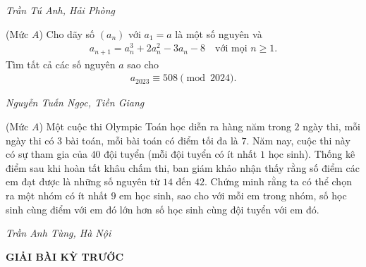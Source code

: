 \begin{multicols}{2}
\begin{figure}[H]
		\vspace*{-10pt}
	\end{figure}
	\begin{flushright}
		\textit{Trần Tú Anh, Hải Phòng}
	\end{flushright}
	{}
	(Mức $A$) Cho dãy số $(a_n)$ với $a_1=a$ là một số nguyên và 
	\begin{align*}
		a_{n+1}=a_n^3+2a_n^2-3a_n-8\quad\text{với mọi $n\ge1$.}
	\end{align*}
	Tìm tất cả các số nguyên $a$  sao cho 
	\begin{align*}
		a_{2023}\equiv508\pmod{2024}.
	\end{align*}
	\begin{flushright}
		\textit{Nguyễn Tuấn Ngọc, Tiền Giang}
	\end{flushright}
	{}
	(Mức $A$) Một cuộc thi Olympic Toán học diễn ra hàng năm trong $2$ ngày thi, mỗi ngày thi có $3$ bài toán, mỗi bài toán có điểm tối đa là $7$. Năm nay, cuộc thi này có sự tham gia của $40$ đội tuyển (mỗi đội tuyển có ít nhất $1$ học sinh). Thống kê điểm sau khi hoàn tất khâu chấm thi,  ban giám khảo nhận thấy rằng số điểm các em đạt được là những số nguyên từ $14$ đến $42$. 
	Chứng minh rằng ta có thể chọn ra một nhóm có ít nhất $9$ em học sinh, sao cho với mỗi em trong nhóm, số học sinh cùng điểm với em đó lớn hơn số học sinh cùng đội tuyển với em đó.
	\begin{flushright}
		\textit{Trần Anh Tùng, Hà Nội}
	\end{flushright}
\end{multicols}
\newpage
\centerline{{\large{\textbf{\color{thachthuctoanhoc}\color{thachthuctoanhoc}GIẢI BÀI KỲ TRƯỚC}}}}
\vspace*{-5pt}
